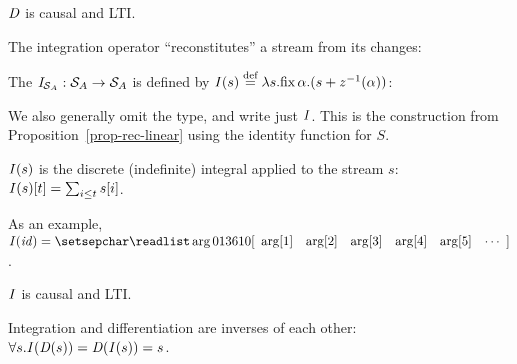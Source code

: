 \begin{proposition}
\label{prop-diff-properties}
$\mathit{D}$ is causal and LTI.
\end{proposition}

The integration operator ``reconstitutes'' a stream from its changes:

\begin{definition}[Integration]
The   $\mathit{I}_{\mathcal{S}_{A}} : \mathcal{S}_{A} \to \mathcal{S}_{A}$
is defined by $\mathit{I}(s) \stackrel{\textrm{\scriptsize def}}{=} \lambda s . \mbox{fix}\,\alpha.(s + z^{-1}(\alpha))$:
\begin{center}
\end{center}
\end{definition}

\noindent
We also generally omit the type, and write just $\mathit{I}$.
This is the construction from Proposition~\ref{prop-rec-linear}
using the identity function for $S$.

\begin{proposition}
$\mathit{I}(s)$ is the discrete (indefinite) integral applied to the stream $s$:
$\mathit{I}(s)[t] = \sum_{i \leq t} s[i]$.
\end{proposition}
\ifstreamexamples
As an example, $\I(\id) = \sv{0 1 3 6 10}$.
\fi

\begin{proposition}
\label{prop-integ-properties}
$\mathit{I}$ is causal and LTI.
\end{proposition}

\begin{theorem}[Inversion]
\label{inverses}
Integration and differentiation are inverses of each other:
$\forall s . \mathit{I}(\mathit{D}(s)) = \mathit{D}(\mathit{I}(s)) = s$.
\end{theorem}

